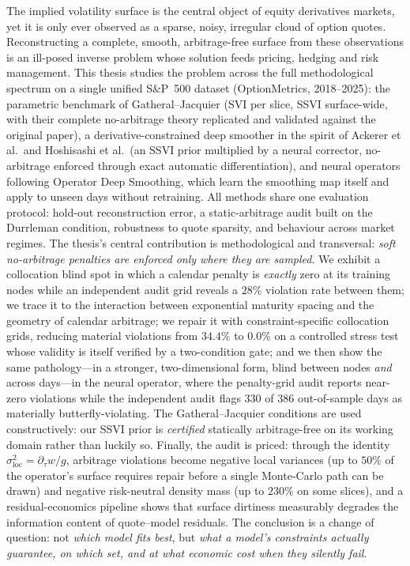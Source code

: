 The implied volatility surface is the central object of equity derivatives markets, yet it is only
ever observed as a sparse, noisy, irregular cloud of option quotes. Reconstructing a complete,
smooth, arbitrage-free surface from these observations is an ill-posed inverse problem whose
solution feeds pricing, hedging and risk management. This thesis studies the problem across the
full methodological spectrum on a single unified S\&P~500 dataset (OptionMetrics, 2018--2025):
the parametric benchmark of Gatheral--Jacquier (SVI per slice, SSVI surface-wide, with their
complete no-arbitrage theory replicated and validated against the original paper), a
derivative-constrained deep smoother in the spirit of Ackerer et al.\ and Hoshisashi et al.\
(an SSVI prior multiplied by a neural corrector, no-arbitrage enforced through exact automatic
differentiation), and neural operators following Operator Deep Smoothing, which learn the
smoothing map itself and apply to unseen days without retraining. All methods share one
evaluation protocol: hold-out reconstruction error, a static-arbitrage audit built on the
Durrleman condition, robustness to quote sparsity, and behaviour across market regimes.
The thesis's central contribution is methodological and transversal: \emph{soft no-arbitrage
penalties are enforced only where they are sampled}. We exhibit a collocation blind spot in
which a calendar penalty is \emph{exactly} zero at its training nodes while an independent audit
grid reveals a $28\%$ violation rate between them; we trace it to the interaction between
exponential maturity spacing and the geometry of calendar arbitrage; we repair it with
constraint-specific collocation grids, reducing material violations from $34.4\%$ to $0.0\%$ on a
controlled stress test whose validity is itself verified by a two-condition gate; and we then show
the same pathology---in a stronger, two-dimensional form, blind between nodes \emph{and} across
days---in the neural operator, where the penalty-grid audit reports near-zero violations while
the independent audit flags $330$ of $386$ out-of-sample days as materially butterfly-violating.
The Gatheral--Jacquier conditions are used constructively: our SSVI prior is \emph{certified}
statically arbitrage-free on its working domain rather than luckily so. Finally, the audit is
priced: through the identity $\sigma_{\mathrm{loc}}^2 = \partial_\tau w / g$, arbitrage violations
become negative local variances (up to $50\%$ of the operator's surface requires repair before a
single Monte-Carlo path can be drawn) and negative risk-neutral density mass (up to $230\%$ on
some slices), and a residual-economics pipeline shows that surface dirtiness measurably degrades
the information content of quote--model residuals. The conclusion is a change of question: not
\emph{which model fits best}, but \emph{what a model's constraints actually guarantee, on which
set, and at what economic cost when they silently fail}.
